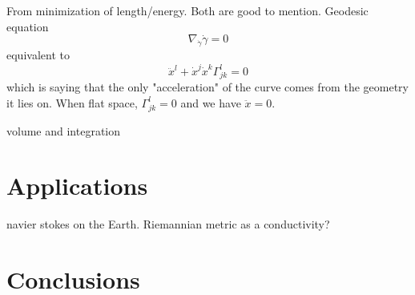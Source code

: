\documentclass[UKenglish]{beamer}
\begin{document}
\begin{frame}{}
	From minimization of length/energy. Both are good to mention.	Geodesic equation
	\[
	\nabla_{\dot{\gamma}} \dot{\gamma}=0
	\]
	equivalent to
	\[
	\ddot{x}^l + \dot{x}^j\dot{x}^k \Gamma_{jk}^l=0
	\]
	which is saying that the only "acceleration" of the curve comes from the geometry it lies on. When flat space, $\Gamma_{jk}^l=0$ and we have $\ddot{x}=0$.
\end{frame}

\begin{frame}{}
	volume and integration
\end{frame}



\section{Applications}
 navier stokes on the Earth. Riemannian metric as a conductivity?








\section{Conclusions}
\end{document}
